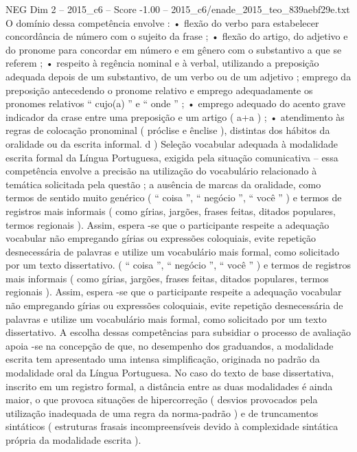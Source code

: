 \begin{textsample}{NEG Dim 2 – 2015\_c6 – Score -1.00 – 2015\_c6/enade\_2015\_teo\_839aebf29e.txt}
O domínio dessa competência envolve : • flexão do verbo para estabelecer concordância de número com o sujeito da frase ; • flexão do artigo, do adjetivo e do pronome para concordar em número e em gênero com o substantivo a que se referem ; • respeito à regência nominal e à verbal, utilizando a preposição adequada depois de um substantivo, de um verbo ou de um adjetivo ; emprego da preposição antecedendo o pronome relativo e emprego adequadamente os pronomes relativos “ cujo(a) ” e “ onde ” ; • emprego adequado do acento grave indicador da crase entre uma preposição e um artigo ( a+a ) ; • atendimento às regras de colocação pronominal ( próclise e ênclise ), distintas dos hábitos da oralidade ou da escrita informal. d ) Seleção vocabular adequada à modalidade escrita formal da Língua Portuguesa, exigida pela situação comunicativa – essa competência envolve a precisão na utilização do vocabulário relacionado à temática solicitada pela questão ; a ausência de marcas da oralidade, como termos de sentido muito genérico ( “ coisa ”, “ negócio ”, “ você ” ) e termos de registros mais informais ( como gírias, jargões, frases feitas, ditados populares, termos regionais ).
Assim, espera -se que o participante respeite a adequação vocabular não empregando gírias ou expressões coloquiais, evite repetição desnecessária de palavras e utilize um vocabulário mais formal, como solicitado por um texto dissertativo. ( “ coisa ”, “ negócio ”, “ você ” ) e termos de registros mais informais ( como gírias, jargões, frases feitas, ditados populares, termos regionais ).
Assim, espera -se que o participante respeite a adequação vocabular não empregando gírias ou expressões coloquiais, evite repetição desnecessária de palavras e utilize um vocabulário mais formal, como solicitado por um texto dissertativo.
A escolha dessas competências para subsidiar o processo de avaliação apoia -se na concepção de que, no desempenho dos graduandos, a modalidade escrita tem apresentado uma intensa simplificação, originada no padrão da modalidade oral da Língua Portuguesa.
No caso do texto de base dissertativa, inscrito em um registro formal, a distância entre as duas modalidades é ainda maior, o que provoca situações de hipercorreção ( desvios provocados pela utilização inadequada de uma regra da norma-padrão ) e de truncamentos sintáticos ( estruturas frasais incompreensíveis devido à complexidade sintática própria da modalidade escrita ).

\end{textsample}
